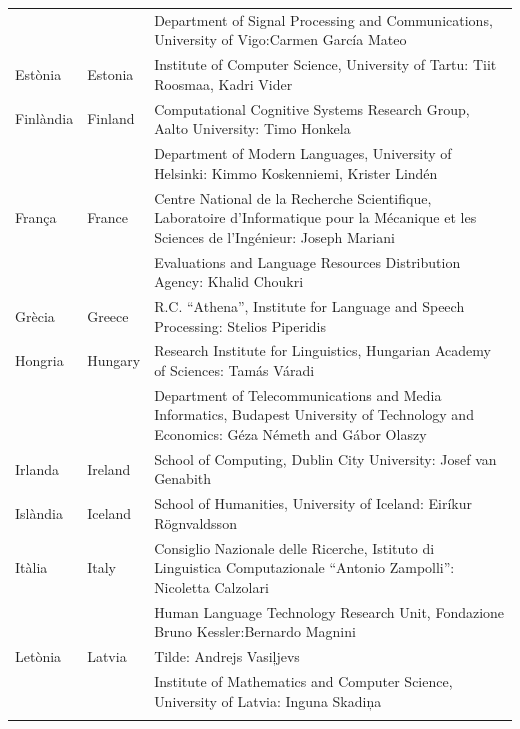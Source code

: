 \begin{longtable}{@{}llp{114mm}@{}}
  & & Department of Signal Processing and Communications, University of Vigo:\newline Carmen García Mateo \\ \addlinespace 
  Estònia & \textcolor{grey1}{Estonia} & Institute of Computer Science, University of Tartu: Tiit Roosmaa, Kadri Vider\\ \addlinespace
  Finlàndia & \textcolor{grey1}{Finland} & Computational Cognitive Systems Research Group, Aalto University: Timo Honkela\\ \addlinespace
  & & Department of Modern Languages, University of Helsinki: Kimmo Koskenniemi, Krister Lindén \\ \addlinespace
  França & \textcolor{grey1}{France} & Centre National de la Recherche Scientifique, Laboratoire d'Informatique pour la Mécanique et les Sciences de l'Ingénieur: Joseph Mariani \\ \addlinespace
  & & Evaluations and Language Resources Distribution Agency: Khalid Choukri\\ \addlinespace 
  Grècia & \textcolor{grey1}{Greece} & R.C. “Athena”, Institute for Language and Speech Processing: Stelios Piperidis\\ \addlinespace
  Hongria & \textcolor{grey1}{Hungary} & Research Institute for Linguistics, Hungarian Academy of Sciences: Tamás Váradi\\  \addlinespace
  & & Department of Telecommunications and Media Informatics, Budapest University of Technology and Economics: Géza Németh and Gábor Olaszy\\ \addlinespace
  Irlanda & \textcolor{grey1}{Ireland} & School of Computing, Dublin City University: Josef van Genabith\\ \addlinespace
  Islàndia & \textcolor{grey1}{Iceland} & School of Humanities, University of Iceland: Eiríkur Rögnvaldsson\\ \addlinespace
  Itàlia & \textcolor{grey1}{Italy} & Consiglio Nazionale delle Ricerche, Istituto di Linguistica Computazionale “Antonio Zampolli”: Nicoletta Calzolari\\ \addlinespace
  & & Human Language Technology Research Unit, Fondazione Bruno Kessler:\newline Bernardo Magnini\\ \addlinespace 
  Letònia & \textcolor{grey1}{Latvia} & Tilde: Andrejs Vasiļjevs\\ \addlinespace 
  & & Institute of Mathematics and Computer Science, University of Latvia: Inguna Skadiņa\\ \addlinespace

\end{longtable}
